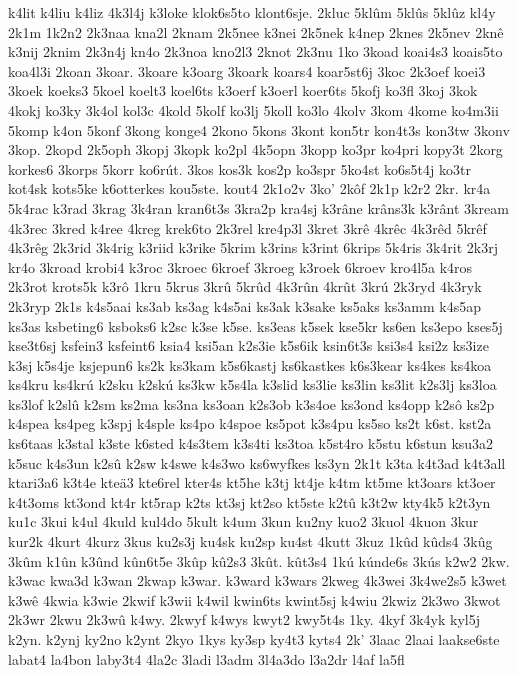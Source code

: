 {k4lit
k4liu
k4liz
4k3l4j
k3loke
klok6s5to
klont6sje.
2kluc
5klûm
5klûs
5klûz
kl4y
2k1m
1k2n2
2k3naa
kna2l
2knam
2k5nee
k3nei
2k5nek
k4nep
2knes
2k5nev
2knê
k3nij
2knim
2k3n4j
kn4o
2k3noa
kno2l3
2knot
2k3nu
1ko
3koad
koai4s3
koais5to
koa4l3i
2koan
3koar.
3koare
k3oarg
3koark
koars4
koar5st6j
3koc
2k3oef
koei3
3koek
koeks3
5koel
koelt3
koel6ts
k3oerf
k3oerl
koer6ts
5kofj
ko3fl
3koj
3kok
4kokj
ko3ky
3k4ol
kol3c
4kold
5kolf
ko3lj
5koll
ko3lo
4kolv
3kom
4kome
ko4m3ii
5komp
k4on
5konf
3kong
konge4
2kono
5kons
3kont
kon5tr
kon4t3s
kon3tw
3konv
3kop.
2kopd
2k5oph
3kopj
3kopk
ko2pl
4k5opn
3kopp
ko3pr
ko4pri
kopy3t
2korg
korkes6
3korps
5korr
ko6rút.
3kos
kos3k
kos2p
ko3spr
5ko4st
ko6s5t4j
ko3tr
kot4sk
kots5ke
k6otterkes
kou5ste.
kout4
2k1o2v
3ko'
2kôf
2k1p
k2r2
2kr.
kr4a
5k4rac
k3rad
3krag
3k4ran
kran6t3s
3kra2p
kra4sj
k3râne
krâns3k
k3rânt
3kream
4k3rec
3kred
k4ree
4kreg
krek6to
2k3rel
kre4p3l
3kret
3krê
4krêc
4k3rêd
5krêf
4k3rêg
2k3rid
3k4rig
k3riid
k3rike
5krim
k3rins
k3rint
6krips
5k4ris
3k4rit
2k3rj
kr4o
3kroad
krobi4
k3roc
3kroec
6kroef
3kroeg
k3roek
6kroev
kro4l5a
k4ros
2k3rot
krots5k
k3rô
1kru
5krus
3krû
5krûd
4k3rûn
4krût
3krú
2k3ryd
4k3ryk
2k3ryp
2k1s
k4s5aai
ks3ab
ks3ag
k4s5ai
ks3ak
k3sake
ks5aks
ks3amm
k4s5ap
ks3as
ksbeting6
ksboks6
k2sc
k3se
k5se.
ks3eas
k5sek
kse5kr
ks6en
ks3epo
kses5j
kse3t6sj
ksfein3
ksfeint6
ksia4
ksi5an
k2s3ie
k5s6ik
ksin6t3s
ksi3s4
ksi2z
ks3ize
k3sj
k5s4je
ksjepun6
ks2k
ks3kam
k5s6kastj
ks6kastkes
k6s3kear
ks4kes
ks4koa
ks4kru
ks4krú
k2sku
k2skú
ks3kw
k5s4la
k3slid
ks3lie
ks3lin
ks3lit
k2s3lj
ks3loa
ks3lof
k2slû
k2sm
ks2ma
ks3na
ks3oan
k2s3ob
k3s4oe
ks3ond
ks4opp
k2sô
ks2p
k4spea
ks4peg
k3spj
k4sple
ks4po
k4spoe
ks5pot
k3s4pu
ks5so
ks2t
k6st.
kst2a
ks6taas
k3stal
k3ste
k6sted
k4s3tem
k3s4ti
ks3toa
k5st4ro
k5stu
k6stun
ksu3a2
k5suc
k4s3un
k2sû
k2sw
k4swe
k4s3wo
ks6wyfkes
ks3yn
2k1t
k3ta
k4t3ad
k4t3all
ktari3a6
k3t4e
kteä3
kte6rel
kter4s
kt5he
k3tj
kt4je
k4tm
kt5me
kt3oars
kt3oer
k4t3oms
kt3ond
kt4r
kt5rap
k2ts
kt3sj
kt2so
kt5ste
k2tû
k3t2w
kty4k5
k2t3yn
ku1c
3kui
k4ul
4kuld
kul4do
5kult
k4um
3kun
ku2ny
kuo2
3kuol
4kuon
3kur
kur2k
4kurt
4kurz
3kus
ku2s3j
ku4sk
ku2sp
ku4st
4kutt
3kuz
1kûd
kûds4
3kûg
3kûm
k1ûn
k3ûnd
kûn6t5e
3kûp
kû2s3
3kût.
kût3s4
1kú
kúnde6s
3kús
k2w2
2kw.
k3wac
kwa3d
k3wan
2kwap
k3war.
k3ward
k3wars
2kweg
4k3wei
3k4we2s5
k3wet
k3wê
4kwia
k3wie
2kwif
k3wii
k4wil
kwin6ts
kwint5sj
k4wiu
2kwiz
2k3wo
3kwot
2k3wr
2kwu
2k3wû
k4wy.
2kwyf
k4wys
kwyt2
kwy5t4s
1ky.
4kyf
3k4yk
kyl5j
k2yn.
k2ynj
ky2no
k2ynt
2kyo
1kys
ky3sp
ky4t3
kyts4
2k'
3laac
2laai
laakse6ste
labat4
la4bon
laby3t4
4la2c
3ladi
l3adm
3l4a3do
l3a2dr
l4af
la5fl
}
